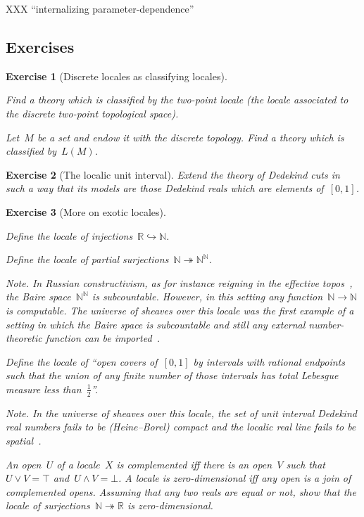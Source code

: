 \documentclass{ws-rv9x6}
\newtheorem{ex}{Exercise}
\newenvironment{exercise}[1]{
  \begin{ex}[#1]
}{\end{ex}}
\newcommand{\NN}{\mathbb{N}}
\newcommand{\RR}{\mathbb{R}}
\renewcommand{\_}{\mathpunct{.}}
\newcommand{\?}{\,{:}\,}
\begin{document}
XXX ``internalizing parameter-dependence''


\subsection{Exercises}

\begin{exercise}{Discrete locales as classifying locales}%
\begin{alphlist}[(b)]
\item Find a theory which is classified by the two-point locale (the locale
associated to the discrete two-point topological space).
\item Let~$M$ be a set and endow it with the discrete topology. Find a theory
which is classified by~$L(M)$.
\end{alphlist}
\end{exercise}

\begin{exercise}{The localic unit interval}%
Extend the theory of Dedekind cuts in such a way that its models are those
Dedekind reals which are elements of~$[0,1]$.
\end{exercise}

\begin{exercise}{More on exotic locales}%
\label{ex:exotic-locales}%
\begin{alphlist}[(d)]
\item Define the locale of injections~$\RR \hookrightarrow \NN$.
\item Define the locale of partial surjections~$\NN \twoheadrightarrow \NN^\NN$.\smallskip

{\scriptsize\emph{Note.} In Russian constructivism, as for instance reigning in
the ef{}fective topos~\cite{hyland:effective-topos,phoa:effective,bauer:c2c}, the Baire space~$\NN^\NN$ is subcountable.
However, in this setting any function~$\NN \to \NN$ is computable.
The universe of sheaves over this locale was the first example of a setting in
which the Baire space is subcountable and still any external number-theoretic
function can be imported~\cite[Section~4.3]{scedrov:forcing}.\par}
\item Define the locale of ``open covers of~$[0,1]$ by intervals with rational
endpoints such that the union of any finite number of those intervals has total
Lebesgue measure less than~$\frac{1}{2}$''.\smallskip

{\scriptsize\emph{Note.} In the universe of sheaves over this locale, the set
of unit interval Dedekind real numbers fails to be (Heine--Borel) compact and
the localic real line fails to be
spatial~\cite[Example~D4.7.13]{johnstone:elephant}.\par}
\item An open~$U$ of a locale~$X$ is \emph{complemented} iff there is an
open~$V$ such that~$U \vee V = \top$ and~$U \wedge V = \bot$. A locale is
\emph{zero-dimensional} iff any open is a join of complemented opens. Assuming
that any two reals are equal or not, show that the locale of surjections~$\NN
\twoheadrightarrow \RR$ is zero-dimensional.
\end{alphlist}
\end{exercise}
\end{document}
